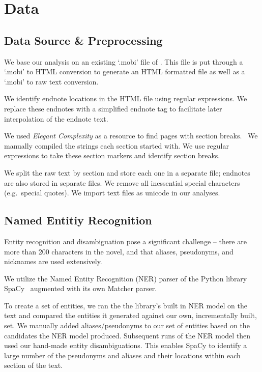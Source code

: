 \section{Data}

\subsection{Data Source \& Preprocessing}

We base our analysis on an existing `.mobi' file of \infinitejest. This file is put through a `.mobi' to HTML conversion to generate an HTML formatted file as well as a `.mobi' to raw text conversion.

We identify endnote locations in the HTML file using regular expressions. We replace these endnotes with a simplified endnote tag to facilitate later interpolation of the endnote text.

We used \textit{Elegant Complexity} as a resource to find pages with section breaks.~\cite{carlisle_2007} We manually compiled the strings each section started with. We use regular expressions to take these section markers and identify section breaks.

We split the raw text by section and store each one in a separate file; endnotes are also stored in separate files. We remove all inessential special characters (e.g.\ special quotes). We import text files as unicode in our analyses.

\subsection{Named Entitiy Recognition}

Entity recognition and disambiguation pose a significant challenge -- there are more than 200 characters in the novel, and that aliases, pseudonyms, and nicknames are used extensively. 

We utilize the Named Entity Recognition (NER) parser of the Python library SpaCy~\cite{spacy2} augmented with its own Matcher parser.

To create a set of entities, we ran the the library's built in NER model on the text and compared the entities it generated against our own, incrementally built, set. We manually added aliases/pseudonyms to our set of entities based on the candidates the NER model produced. Subsequent runs of the NER model then used our hand-made entity disambiguations. This enables SpaCy to identify a large number of the pseudonyms and aliases and their locations within each section of the text.

